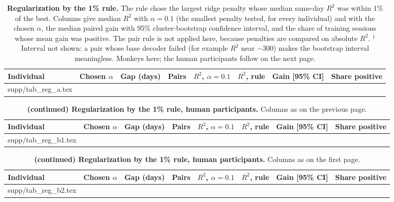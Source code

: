 \documentclass[pdflatex,sn-nature]{sn-jnl}
\makeatletter
\newcommand\tabinput[1]{\@@input #1 }
\makeatother
\begin{document}
\begin{landscape}
\begin{table}[p]
\caption{\textbf{Regularization by the 1\% rule.} The rule chose the largest ridge penalty whose median same-day $R^2$
was within 1\% of the best. Columns give median $R^2$ with $\alpha = 0.1$ (the smallest penalty tested, for every
individual) and with the chosen $\alpha$, the median paired gain with 95\% cluster-bootstrap confidence interval, and the
share of training sessions whose mean gain was positive. The pair rule is not applied here, because penalties are
compared on absolute $R^2$. $^\dagger$Interval not shown: a pair whose base decoder failed (for example $R^2$ near
$-300$) makes the bootstrap interval meaningless. Monkeys here; the human participants follow on the next page.}
\label{tab:reg}
\scriptsize\setlength{\tabcolsep}{3.5pt}
\begin{tabular}{@{}llrrrrlr@{}}
\toprule
Individual & Chosen $\alpha$ & Gap (days) & Pairs & $R^2$, $\alpha = 0.1$ & $R^2$, rule & Gain [95\% CI] &
Share positive \\
\midrule
\tabinput{supp/tab_reg_a.tex}
\botrule
\end{tabular}
\end{table}
\end{landscape}

\begin{landscape}
\begin{table}[p]
\addtocounter{table}{-1}
\caption{\textbf{(continued) Regularization by the 1\% rule, human participants.} Columns as on the previous page.}
\scriptsize\setlength{\tabcolsep}{3.5pt}
\begin{tabular}{@{}llrrrrlr@{}}
\toprule
Individual & Chosen $\alpha$ & Gap (days) & Pairs & $R^2$, $\alpha = 0.1$ & $R^2$, rule & Gain [95\% CI] &
Share positive \\
\midrule
\tabinput{supp/tab_reg_b1.tex}
\botrule
\end{tabular}
\end{table}
\end{landscape}

\begin{landscape}
\begin{table}[p]
\addtocounter{table}{-1}
\caption{\textbf{(continued) Regularization by the 1\% rule, human participants.} Columns as on the first page.}
\scriptsize\setlength{\tabcolsep}{3.5pt}
\begin{tabular}{@{}llrrrrlr@{}}
\toprule
Individual & Chosen $\alpha$ & Gap (days) & Pairs & $R^2$, $\alpha = 0.1$ & $R^2$, rule & Gain [95\% CI] &
Share positive \\
\midrule
\tabinput{supp/tab_reg_b2.tex}
\botrule
\end{tabular}
\end{table}
\end{landscape}
\end{document}
